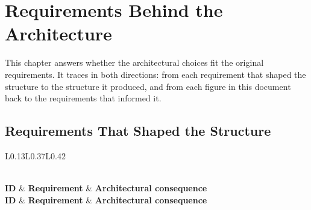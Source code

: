 \chapter{Requirements Behind the Architecture}
\label{ch:requirements}

This chapter answers whether the architectural choices fit the original
requirements. It traces in both directions: from each requirement that shaped
the structure to the structure it produced, and from each figure in this
document back to the requirements that informed it.

\section{Requirements That Shaped the Structure}

\begin{longtable}{L{0.13\textwidth}L{0.37\textwidth}L{0.42\textwidth}}
	\caption{Requirements and the architecture they produced}\label{tab:req-to-arch}\\
	\toprule
	\textbf{ID} & \textbf{Requirement} & \textbf{Architectural consequence} \\
	\midrule
	\endfirsthead
	\toprule
	\textbf{ID} & \textbf{Requirement} & \textbf{Architectural consequence} \\
	\midrule
	\endhead


\end{longtable}
